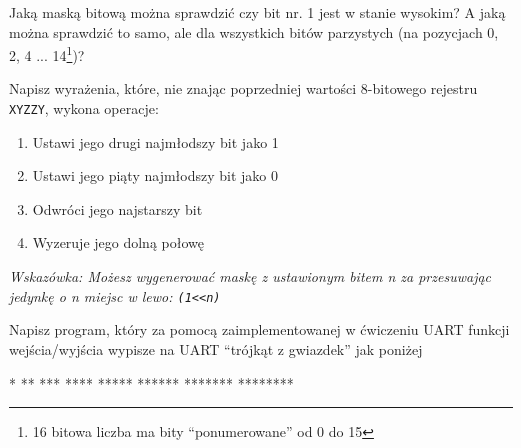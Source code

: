 \dbEntryCheckResults
  Jaką maską bitową można sprawdzić czy bit nr. 1 jest w stanie wysokim? A jaką można sprawdzić to samo, ale
  dla wszystkich bitów parzystych (na pozycjach 0, 2, 4 ... 14\footnote{16 bitowa liczba ma bity ``ponumerowane'' od 0 do 15})?
\fi

\dbEntryCheckResults
  Napisz wyrażenia, które, nie znając poprzedniej wartości 8-bitowego rejestru \Verb$XYZZY$, wykona operacje:
  \begin{enumerate}
  \item Ustawi jego drugi najmłodszy bit jako 1
  \item Ustawi jego piąty najmłodszy bit jako 0
  \item Odwróci jego najstarszy bit
  \item Wyzeruje jego dolną połowę
  \end{enumerate}
  \textit{Wskazówka: Możesz wygenerować maskę z ustawionym bitem n za przesuwając jedynkę o n miejsc w lewo: \Verb$(1<<n)$}
\fi

\dbEntryCheckResults
Napisz program, który za pomocą zaimplementowanej w ćwiczeniu UART funkcji wejścia/wyjścia wypisze na UART
``trójkąt z gwiazdek'' jak poniżej

\begin{CodeFrame*}[text]{}
*
**
***
****
*****
******
*******
********
\end{CodeFrame*}
\fi
